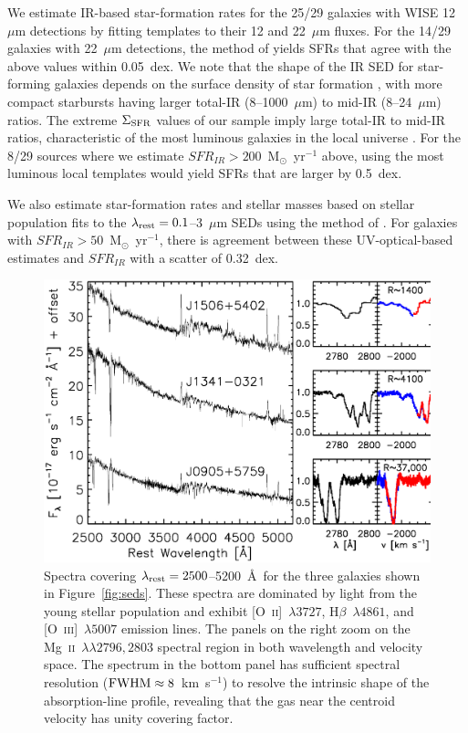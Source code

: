 \documentclass[apj]{emulateapj}
\newcommand{\kms}{km~s$^{-1}$}
\newcommand{\mgii}{\textrm{Mg}~\textsc{ii}}
\newcommand{\oii}{[\textrm{O}~\textsc{ii}]}
\newcommand{\oiii}{[\textrm{O}~\textsc{iii}]}
\newcommand{\msun}{M$_{\odot}$}
\newcommand{\lrest}{\lambda_{\textnormal{\scriptsize{rest}}}}
\newcommand{\sigmasfr}{\Sigma_{\textnormal{\scriptsize{SFR}}}}
\begin{document}
We estimate IR-based star-formation rates for the 25/29 galaxies with
WISE 12~$\mu$m detections by fitting \citet{cha01} templates to their
12 and 22~$\mu$m fluxes.  For the 14/29 galaxies with 22~$\mu$m
detections, the method of \citet{ruj12} yields SFRs that agree with
the above values within 0.05~dex.  We note that the shape of the IR
SED for star-forming galaxies depends on the surface density of star
formation \citep[e.g.,][]{ruj11,elb11}, with more compact starbursts
having larger total-IR (8--1000~$\mu$m) to mid-IR (8--24~$\mu$m)
ratios.  The extreme $\sigmasfr$ values of our sample imply large
total-IR to mid-IR ratios, characteristic of the most luminous
galaxies in the local universe \citep[e.g.,][]{cha01,dal02,rie09}.
For the 8/29 sources where we estimate $SFR_{IR}>200$~\msun~yr$^{-1}$
above, using the most luminous local templates would yield SFRs that
are larger by 0.5~dex.

We also estimate star-formation rates and stellar masses based on
stellar population fits to the $\lrest=0.1$--3~$\mu$m SEDs using the
method of \citet{mou11}.  For galaxies with
$SFR_{IR}>50$~\msun~yr$^{-1}$, there is agreement between these
UV-optical-based estimates and $SFR_{IR}$ with a scatter of 0.32~dex.

\begin{figure}[!t]
\includegraphics[angle=0,scale=0.41]{spectra.ps}
\caption{Spectra covering $\lrest=2500$--5200~\AA\ for the three
  galaxies shown in Figure~\ref{fig:seds}.  These spectra are
  dominated by light from the young stellar population and exhibit
  \oii~$\lambda3727$, H$\beta$~$\lambda4861$, and \oiii~$\lambda5007$
  emission lines.  The panels on the right zoom on the
  \mgii~$\lambda\lambda2796,2803$ spectral region in both wavelength
  and velocity space.  The spectrum in the bottom panel has sufficient
  spectral resolution ($\textnormal{FWHM}\approx8$~\kms) to resolve
  the intrinsic shape of the absorption-line profile, revealing that
  the gas near the centroid velocity has unity covering factor.}
\label{fig:spectra}
\end{figure}
\end{document}

